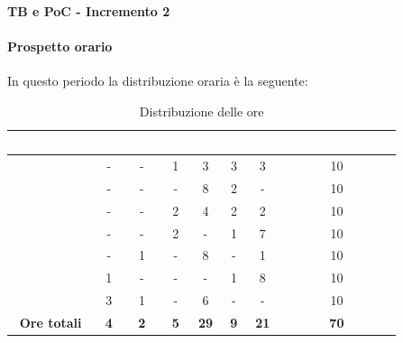 \paragraph{TB e PoC - Incremento 2}
\paragraph*{Prospetto orario}
In questo periodo la distribuzione oraria è la seguente:
\begin{table}[H]
	\begin{center}
		\begin{tabular}{ |c c c c c c c c| }
			\rowcolor{darkblue} 
			\textcolor{white}{\textbf{Nominativo}} & \textcolor{white}{\textbf{Re}} & \textcolor{white}{\textbf{Am}} & \textcolor{white}{\textbf{An}} & \textcolor{white}{\textbf{Pt}} & \textcolor{white}{\textbf{Pr}} & \textcolor{white}{\textbf{Ve}} & \textcolor{white}{\textbf{Ore Complessive}} \\ \hline
			\BL 	& -		& -  	& 1 	& 3 	& 3 	& 3		& 10 \\ \hline
			\FF 	& -  	& -  	& - 	& 8 	& 2 	& -  	& 10 \\ \hline
			\MM 	& -  	& -  	& 2 	& 4		& 2 	& 2  	& 10 \\ \hline
			\PC 	& - 	& -  	& 2 	& - 	& 1 	& 7 	& 10 \\ \hline
			\TG 	& -  	& 1 	& - 	& 8		& - 	& 1 	& 10 \\ \hline
			\TL 	& 1  	& - 	& - 	& - 	& 1 	& 8 	& 10 \\ \hline
			\VD 	& 3  	& 1  	& - 	& 6 	& - 	& -  	& 10 \\ \hline
			\textbf{Ore totali} & \textbf{4} & \textbf{2} & \textbf{5} & \textbf{29} & \textbf{9} & \textbf{21} & \textbf{70} \\ \hline
		\end{tabular}
		\caption{Distribuzione delle ore}
	\end{center}
\end{table}
